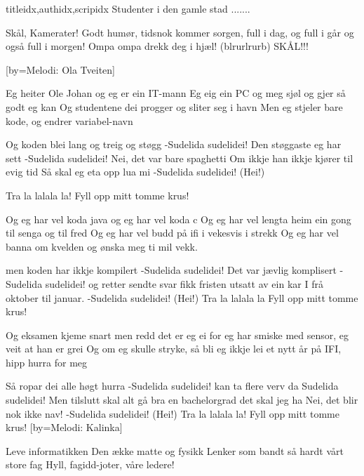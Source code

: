\documentclass[14pt,letterpaper,norsk]{article}
\begin{document}
\begin{songs}{titleidx,authidx,scripidx}
\beginchorus
Studenter i den gamle stad .......
\endchorus

\endsong


\beginverse
Skål, Kamerater!  
Godt humør,   
tidsnok kommer sorgen,  
full i dag, og full i går  
og også full i morgen!  
Ompa ompa drekk deg i hjæl!  
(blrurlrurb) SKÅL!!!  
\endverse

\endsong

[by=Melodi: Ola Tveiten]

\beginverse
Eg heiter Ole Johan og eg er ein IT-mann
Eg eig ein PC og meg sjøl og gjer så godt eg kan
Og studentene dei progger og sliter seg i havn
Men eg stjeler bare kode, og endrer variabel-navn
\endverse

\beginchorus
Og koden blei lang og treig og støgg
-Sudelida sudelidei!
Den støggaste eg har sett
-Sudelida sudelidei!
Nei, det var bare spaghetti
Om ikkje han ikkje kjører til evig tid
Så skal eg eta opp lua mi
-Sudelida sudelidei! (Hei!)
\endchorus

\beginchorus
Tra la lalala la!
Fyll opp mitt tomme krus!
\endchorus

\beginverse
Og eg har vel koda java og eg har vel koda c
Og eg har vel lengta heim ein gong til senga og til fred
Og eg har vel budd på ifi i vekesvis i strekk
Og eg har vel banna om kvelden og ønska meg ti mil vekk.
\endverse

\beginchorus
men koden har ikkje kompilert
-Sudelida sudelidei!
Det var jævlig komplisert
-Sudelida sudelidei!
og retter sendte svar
fikk fristen utsatt av ein kar
I frå oktober til januar.
-Sudelida sudelidei! (Hei!)
Tra la lalala la
Fyll opp mitt tomme krus!
\endchorus

\beginverse
Og eksamen kjeme snart men redd det er eg ei
for eg har smiske med sensor, eg veit at han er grei
Og om eg skulle stryke, så bli eg ikkje lei
et nytt år på IFI, hipp hurra for meg
\endverse

\beginchorus
Så ropar dei alle høgt hurra
-Sudelida sudelidei!
kan ta flere verv da
Sudelida sudelidei!
Men tilslutt skal alt gå bra
en bachelorgrad det skal jeg ha
Nei, det blir nok ikke nav!
-Sudelida sudelidei! (Hei!)
Tra la lalala la!
Fyll opp mitt tomme krus!
\endchorus
\endsong
{}[by=Melodi: Kalinka]

\beginverse
Leve informatikken
Den ække matte og fysikk
Lenker som bandt så hardt vårt store fag
Hyll, fagidd-joter, våre ledere!
\endverse


\end{songs}
\end{document}
